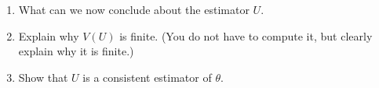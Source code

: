 \documentclass[12pt]{article}
\newcommand{\nl}{\vspace{0.1in}\noindent}
\begin{document}
\begin{enumerate}
\begin{enumerate}
        \nl 
\newpage
        \item What can we now conclude about the estimator $U$.
         
        \nl 

        \vspace{.5in}
        \item Explain why $V(U)$ is finite. (You do not have to compute it, but clearly explain
        why it is finite.)
         
        \nl 
        \vspace{.5in}
        \item Show that $U$ is a consistent estimator of $\theta$.
         
        \nl 

    \end{enumerate}
\end{enumerate}
\end{document}
